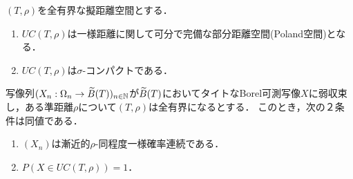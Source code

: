 \documentclass[uplatex,dvipdfmx]{jsreport}
\begin{document}
\begin{proposition}\label{prop-UC-is-Polish}
    $(T,\rho)$を全有界な擬距離空間とする．
    \begin{enumerate}
        \item $UC(T,\rho)$は一様距離に関して可分で完備な部分距離空間(Poland空間)となる．
        \item $UC(T,\rho)$は$\sigma$-コンパクトである．
    \end{enumerate}
\end{proposition}

\begin{theorem}\label{thm-limit-is-in-UC}
    写像列$(X_n:\Omega_n\to\widetilde{B}(T))_{n\in\mathbb{N}}$が$\widetilde{B}(T)$においてタイトなBorel可測写像$X$に弱収束し，ある準距離$\rho$について$(T,\rho)$は全有界になるとする．
    このとき，次の２条件は同値である．
    \begin{enumerate}
        \item $(X_n)$は漸近的$\rho$-同程度一様確率連続である．
        \item $P(X\in UC(T,\rho))=1$．
    \end{enumerate}
\end{theorem}
\end{document}
